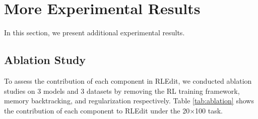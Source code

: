\section{More Experimental Results}
\label{app:results}
In this section, we present additional experimental results.

\subsection{Ablation Study}
\label{app:ablation}
To assess the contribution of each component in RLEdit, we conducted ablation studies on 3 models and 3 datasets by removing the RL training framework, memory backtracking, and regularization respectively. Table \ref{tab:ablation} shows the contribution of each component to RLEdit under the 20$\times$100 task.

